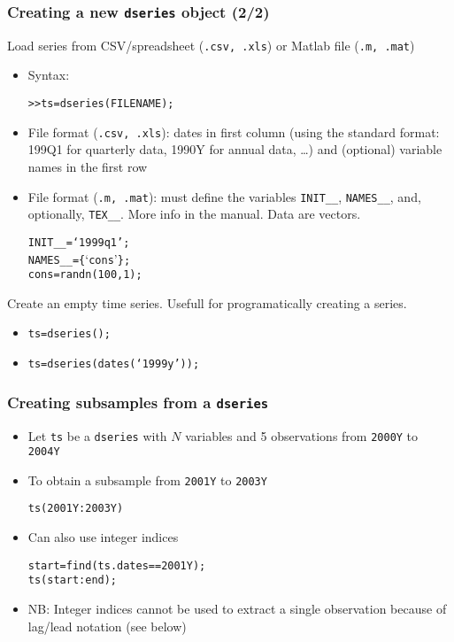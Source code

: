 \documentclass[10pt]{beamer}
\newcommand{\myitem}{\item[$\bullet$]}
\begin{document}
\begin{frame}[fragile,t]
  \frametitle{Creating a new \texttt{dseries} object (2/2)}
  Load series from CSV/spreadsheet (\texttt{.csv, .xls}) or Matlab file (\texttt{.m, .mat})
  \begin{itemize}
    \myitem Syntax:
    \begin{alltt}
  >> ts = dseries(FILENAME);
    \end{alltt}
    \myitem File format (\texttt{.csv, .xls}): dates in first column (using the standard format:
    199Q1 for quarterly data, 1990Y for annual data, \dots) and (optional)
    variable names in the first row
    \myitem File format (\texttt{.m, .mat}): must define the variables \texttt{INIT\_\_},
    \texttt{NAMES\_\_}, and, optionally, \texttt{TEX\_\_}. More info in the
    manual. Data are vectors.
    \begin{alltt}
      INIT__ = `1999q1’;
      NAMES__ = \{`cons'\};
      cons = randn(100,1);
    \end{alltt}
  \end{itemize}
  Create an empty time series. Usefull for programatically creating a series.
  \begin{itemize}
    \myitem \texttt{ts=dseries();}
    \myitem \texttt{ts=dseries(dates(`1999y'));}
  \end{itemize}
\end{frame}



\begin{frame}[fragile,t]
  \frametitle{Creating subsamples from a \texttt{dseries}}
  \begin{itemize}
    \myitem Let \texttt{ts} be a \texttt{dseries} with $N$ variables and 5
    observations from \texttt{2000Y} to \texttt{2004Y}
    \myitem To obtain a subsample from \texttt{2001Y} to \texttt{2003Y}
    \begin{alltt}
  ts(2001Y:2003Y)
    \end{alltt}
    \myitem Can also use integer indices
    \begin{alltt}
  start = find(ts.dates==2001Y);
  ts(start:end);
    \end{alltt}
    \myitem NB: Integer indices cannot be used to extract a single observation
    because of lag/lead notation (see below)
  \end{itemize}
\end{frame}
\end{document}
